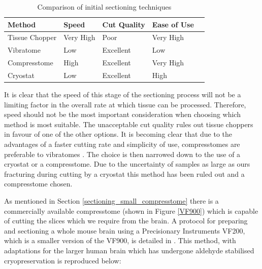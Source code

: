 \documentclass[a4paper, 11pt]{article}
\numberwithin{equation}{section}
\begin{document}
	\begin{table}[h]
		\centering
		\caption{Comparison of initial sectioning techniques}
		\label{inital_sectioning_comparison}
		\begin{tabular}{|l|l|l|l|l|}
			\hline
			\textbf{Method} & \textbf{Speed} & \textbf{Cut Quality} & \textbf{Ease of Use} \\ \hline
			Tissue Chopper  & Very High      & Poor                 & Very High            \\ \hline
			Vibratome       & Low            & Excellent            & Low                  \\ \hline
			Compresstome    & High           & Excellent            & Very High            \\ \hline
			Cryostat        & Low            & Excellent            & High                 \\ \hline
		\end{tabular}
	\end{table}
	
	It is clear that the speed of this stage of the sectioning process will not be a limiting factor in the overall rate at which tissue can be processed. Therefore, speed should not be the most important consideration when choosing which method is most suitable. The unacceptable cut quality rules out tissue choppers in favour of one of the other options. It is becoming clear that due to the advantages of a faster cutting rate and simplicity of use, compresstomes are preferable to vibratomes \cite{abdelaal2015comparison}. The choice is then narrowed down to the use of a cryostat or a compresstome. Due to the uncertainty of samples as large as ours fracturing during cutting by a cryostat this method has been ruled out and a compresstome chosen.
	
	As mentioned in Section \ref{sectioning_small_compresstome} there is a commercially available compresstome (shown in Figure \ref{VF900}) which is capable of cutting the slices which we require from the brain. A protocol for preparing and sectioning a whole mouse brain using a Precisionary Instruments VF200, which is a smaller version of the VF900, is detailed in \cite{selever2011rapid}. This method, with adaptations for the larger human brain which has undergone aldehyde stabilised cryopreservation is reproduced below:
	
\end{document}
